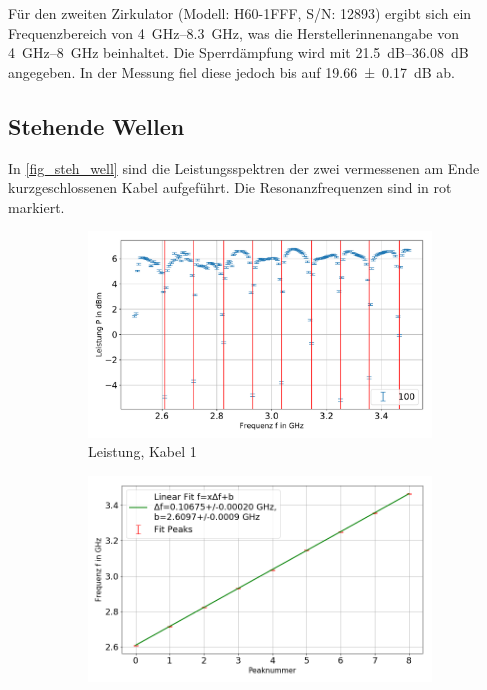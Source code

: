 \documentclass[
	a4paper,
	12pt,
	pagesize,
	ngerman
]{scrartcl}
\begin{document}
	Für den zweiten Zirkulator (Modell: H60-1FFF, S/N: 12893) ergibt sich ein Frequenzbereich von \SIrange{4}{8,3}{\giga \hertz}, was die Herstellerinnenangabe von \SIrange{4}{8}{\giga \hertz} beinhaltet.
	Die Sperrdämpfung wird mit \SIrange{21,5}{36,08}{dB} angegeben.
	In der Messung fiel diese jedoch bis auf \SI{19,66 \pm 0,17}{dB} ab.

	\subsection{Stehende Wellen}
	In \cref{fig_steh_well} sind die Leistungsspektren der zwei vermessenen am Ende kurzgeschlossenen Kabel aufgeführt.
	Die Resonanzfrequenzen sind in rot markiert.

	\begin{figure}[H]
        \centering
        \begin{subfigure}[b]{0.495\textwidth}
            \centering
            \includegraphics[width=\textwidth]{img/100}
            \caption%
            {Leistung, Kabel 1}
            \label{fig_leistung_100}
        \end{subfigure}
        \hfill
        \begin{subfigure}[b]{0.495\textwidth}
            \centering
            \includegraphics[width=\textwidth]{img/100_fit}

\end{subfigure}
\end{figure}
\end{document}
